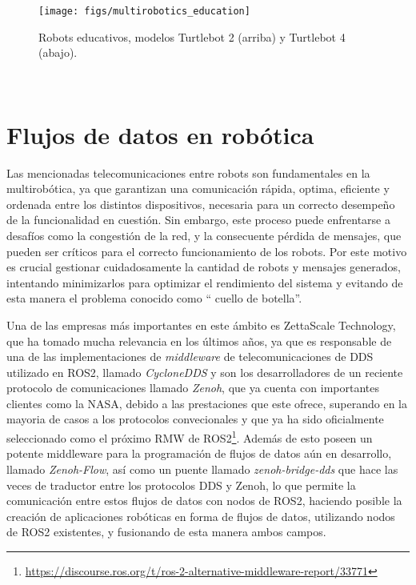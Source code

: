 \begin{figure} [h!]
  \begin{center}
    \texttt{[image: figs/multirobotics\_education]}
  \end{center}
  \caption{Robots educativos, modelos Turtlebot 2 (arriba) y Turtlebot 4 (abajo).}
  \label{fig:robots_education}
\end{figure}\



\section{Flujos de datos en robótica}
\label{sec:flujos_datos} %

Las mencionadas telecomunicaciones entre robots son fundamentales en la
multirobótica, ya que garantizan una comunicación rápida, optima, eficiente y
ordenada entre los distintos dispositivos, necesaria para un correcto desempeño
de la funcionalidad en cuestión.
Sin embargo, este proceso puede enfrentarse a desafíos como la congestión de la
red, y la consecuente pérdida de mensajes, que pueden ser críticos para el
correcto funcionamiento de los robots.
Por este motivo es crucial gestionar cuidadosamente la cantidad de robots y
mensajes generados, intentando minimizarlos para optimizar el rendimiento del
sistema y evitando de esta manera el problema conocido como \textquotedblleft
cuello de botella\textquotedblright.

Una de las empresas más importantes en este ámbito es ZettaScale Technology, que
ha tomado mucha relevancia en los últimos años, ya que es responsable de una de
las implementaciones de \textit{middleware} de telecomunicaciones de DDS
utilizado en ROS2, llamado \textit{CycloneDDS} y son los desarrolladores de un
reciente protocolo de comunicaciones llamado \textit{Zenoh}, que ya cuenta con
importantes clientes como la NASA, debido a las prestaciones que este ofrece,
superando en la mayoria de casos a los protocolos convecionales y que ya ha sido
oficialmente seleccionado como el próximo RMW de
ROS2\footnote{\url{https://discourse.ros.org/t/ros-2-alternative-middleware-report/33771}}.
Además de esto poseen un potente middleware para la programación de flujos de
datos aún en desarrollo, llamado \textit{Zenoh-Flow}, así como un puente llamado
\textit{zenoh-bridge-dds} que hace las veces de traductor entre los protocolos
DDS y Zenoh, lo que permite la comunicación entre estos flujos de datos con
nodos de ROS2, haciendo posible la creación de aplicaciones robóticas en forma
de flujos de datos, utilizando nodos de ROS2 existentes, y fusionando de esta
manera ambos campos.

